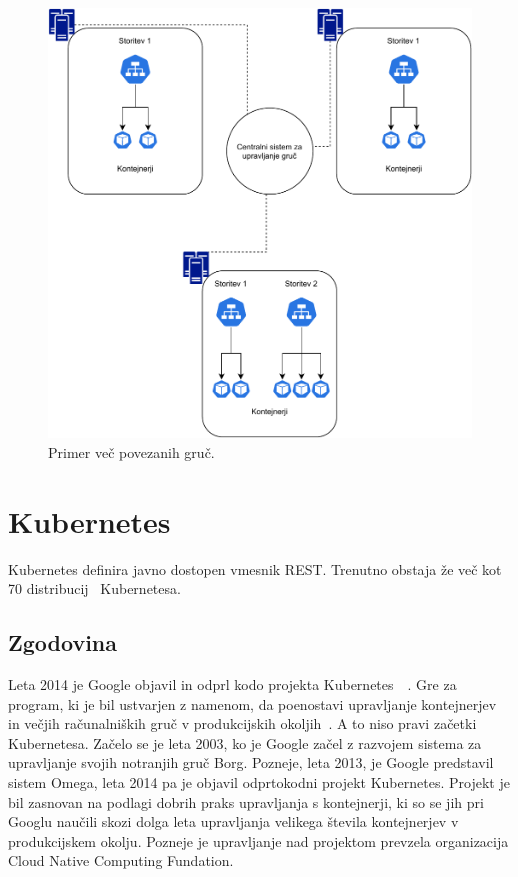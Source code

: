 \documentclass[a4paper, 12pt]{book}
\begin{document}
\begin{figure}[h]
\begin{center}
\includegraphics[width=1.0\textwidth]{images/primer-povezanih-gruc.pdf}
\end{center}
\caption{Primer več povezanih gruč.}
\label{problem-povezanih-gruc}
\end{figure}

\chapter{Kubernetes}
\label{Kubernetes}
Kubernetes definira javno dostopen vmesnik REST.
Trenutno obstaja že več kot 70 distribucij~\cite{cncf} Kubernetesa.
\section{Zgodovina}
Leta 2014 je Google objavil in odprl kodo projekta Kubernetes~\cite{mastering-kubernetes}~\cite{borg-omega-kubernetes}.
Gre za program, ki je bil ustvarjen z namenom, da poenostavi upravljanje kontejnerjev in večjih računalniških gruč v produkcijskih okoljih~\cite{what-is-Kubernetes}.
A to niso pravi začetki Kubernetesa.
Začelo se je leta 2003, ko je Google začel z razvojem sistema za upravljanje svojih notranjih gruč Borg.
Pozneje, leta 2013, je Google predstavil sistem Omega, leta 2014 pa je objavil odprtokodni projekt Kubernetes. 
Projekt je bil zasnovan na podlagi dobrih praks upravljanja s kontejnerji, ki so se jih pri Googlu naučili skozi dolga leta upravljanja velikega števila kontejnerjev v produkcijskem okolju.
Pozneje je upravljanje nad projektom prevzela organizacija Cloud Native Computing Fundation.
\end{document}
